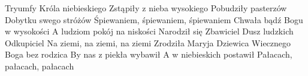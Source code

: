 \beginverse
Tryumfy Króla niebieskiego
Zstąpiły z nieba wysokiego
Pobudziły pasterzów
Dobytku swego stróżów
Śpiewaniem, śpiewaniem, śpiewaniem
\endverse
\beginverse
Chwała bądź Bogu w wysokości
A ludziom pokój na niskości
Narodził się Zbawiciel
Dusz ludzkich Odkupiciel
Na ziemi, na ziemi, na ziemi
\endverse
\beginverse
Zrodziła Maryja Dziewica
Wiecznego Boga bez rodzica
By nas z piekła wybawił
A w niebieskich postawił
Pałacach, pałacach, pałacach
\endverse
\endsong